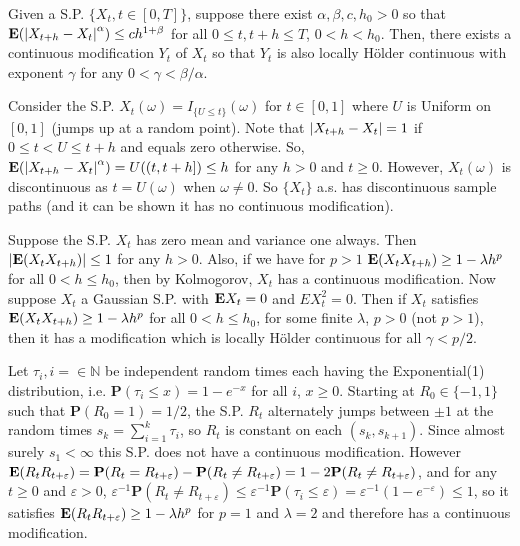 \begin{theorem*}
Given a S.P. $\{X_t, t\in[0,T]\}$, suppose there exist $\alpha,\beta,c,h_0>0$ so that 
$\mathbf{E}(\left\lvert X_{t+h} - X_t \right\rvert^\alpha) \leq ch^{1+\beta}$ for all $0 \leq t,t+h \leq T$, $0 < h < h_0$. Then, there exists a continuous modification $Y_t$ of $X_t$ so that $Y_t$ is also locally H\"older continuous with exponent $\gamma$ for any $0 < \gamma < \beta/\alpha$.
\end{theorem*}

\begin{example*}
Consider the S.P. $X_t(\omega) = I_{\{U\leq t\}}(\omega)$ for $t\in[0,1]$ where $U$ is Uniform on $[0,1]$ (jumps up at a random point). Note that $\left\lvert X_{t+h}-X_t \right\rvert = 1$ if $0\leq t<U\leq t+h$ and equals zero otherwise. So, $\mathbf{E}(\left\lvert X_{t+h}-X_t \right\rvert^\alpha) = U((t,t+h]) \leq h$ for any $h>0$ and $t\geq0$. However, $X_t(\omega)$ is discontinuous as $t=U(\omega)$ when $\omega\not=0$. So $\{X_t\}$ a.s. has discontinuous sample paths (and it can be shown it has no continuous modification).
\end{example*}

\begin{exercise*}
Suppose the S.P. $X_t$ has zero mean and variance one always. Then $\left\lvert \mathbf{E}(X_t X_{t+h}) \right\rvert \leq 1$ for any $h > 0$. Also, if we have for $p>1$ $\mathbf{E}(X_t X_{t+h}) \geq 1 - \lambda h^p$ for all $0 < h \leq h_0$, then by Kolmogorov, $X_t$ has a continuous modification. Now suppose $X_t$ a Gaussian S.P. with $\mathbf{E} X_t=0$ and $E X^2_t = 0$. Then if $X_t$ satisfies $\mathbf{E}(X_tX_{t+h})\geq1-\lambda h^p$ for all $0<h\leq h_0$, for some finite $\lambda$, $p > 0$ (not $p > 1$), then it has a modification which is locally H\"older continuous for all $\gamma < p/2$.
\end{exercise*}

\begin{example*}
Let $\tau_i, i=\in\mathbb N$ be independent random times each having the Exponential(1) distribution, i.e. $\mathbf P(\tau_i \leq x) = 1 - e^{-x}$ for all $i$, $x\geq0$. Starting at $R_0\in\{-1,1\}$ such that $\mathbf P(R_0=1)=1/2$, the S.P. $R_t$ alternately jumps between $\pm 1$ at the random times $s_k = \sum_{i=1}^k \tau_i$, so $R_t$ is constant on each $(s_k,s_{k+1})$. Since almost surely $s_1<\infty$ this S.P. does not have a continuous modification. However $\mathbf{E}(R_tR_{t+\varepsilon}) = \mathbf P(R_t = R_{t+\varepsilon}) - \mathbf P(R_t \not= R_{t+\varepsilon}) = 1 - 2\mathbf P(R_t \not= R_{t+\varepsilon})$, and for any $t\geq 0$ and $\varepsilon >0$, $\varepsilon^{-1} \mathbf P(R_t \not= R_{t+\varepsilon}) \leq \varepsilon^{-1} \mathbf P(\tau_i \leq \varepsilon) = \varepsilon^{-1}(1-e^{-\varepsilon}) \leq 1$, so it satisfies $\mathbf{E}(R_t R_{t+\varepsilon}) \geq 1 - \lambda h^p$ for $p=1$ and $\lambda =2$ and therefore has a continuous modification.
\end{example*}

